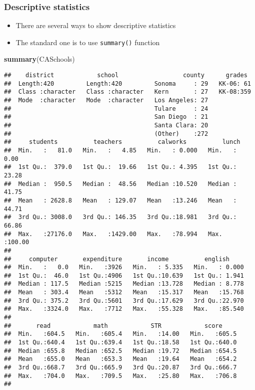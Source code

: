 \documentclass[]{book}
\newenvironment{Shaded}{\begin{snugshade}}{\end{snugshade}}
\newcommand{\KeywordTok}[1]{\textcolor[rgb]{0.13,0.29,0.53}{\textbf{#1}}}
\newcommand{\NormalTok}[1]{#1}
\providecommand{\tightlist}{%
  \setlength{\itemsep}{0pt}\setlength{\parskip}{0pt}}
\begin{document}
\hypertarget{descriptive-statistics}{%
\subsubsection{Descriptive statistics}\label{descriptive-statistics}}

\begin{itemize}
\tightlist
\item
  There are several ways to show descriptive statistics
\item
  The standard one is to use \texttt{summary()} function
\end{itemize}

\begin{Shaded}
\begin{Highlighting}[]
\KeywordTok{summary}\NormalTok{(CASchools)}
\end{Highlighting}
\end{Shaded}

\begin{verbatim}
##    district            school                  county      grades   
##  Length:420         Length:420         Sonoma     : 29   KK-06: 61  
##  Class :character   Class :character   Kern       : 27   KK-08:359  
##  Mode  :character   Mode  :character   Los Angeles: 27              
##                                        Tulare     : 24              
##                                        San Diego  : 21              
##                                        Santa Clara: 20              
##                                        (Other)    :272              
##     students          teachers          calworks          lunch       
##  Min.   :   81.0   Min.   :   4.85   Min.   : 0.000   Min.   :  0.00  
##  1st Qu.:  379.0   1st Qu.:  19.66   1st Qu.: 4.395   1st Qu.: 23.28  
##  Median :  950.5   Median :  48.56   Median :10.520   Median : 41.75  
##  Mean   : 2628.8   Mean   : 129.07   Mean   :13.246   Mean   : 44.71  
##  3rd Qu.: 3008.0   3rd Qu.: 146.35   3rd Qu.:18.981   3rd Qu.: 66.86  
##  Max.   :27176.0   Max.   :1429.00   Max.   :78.994   Max.   :100.00  
##                                                                       
##     computer       expenditure       income          english      
##  Min.   :   0.0   Min.   :3926   Min.   : 5.335   Min.   : 0.000  
##  1st Qu.:  46.0   1st Qu.:4906   1st Qu.:10.639   1st Qu.: 1.941  
##  Median : 117.5   Median :5215   Median :13.728   Median : 8.778  
##  Mean   : 303.4   Mean   :5312   Mean   :15.317   Mean   :15.768  
##  3rd Qu.: 375.2   3rd Qu.:5601   3rd Qu.:17.629   3rd Qu.:22.970  
##  Max.   :3324.0   Max.   :7712   Max.   :55.328   Max.   :85.540  
##                                                                   
##       read            math            STR            score      
##  Min.   :604.5   Min.   :605.4   Min.   :14.00   Min.   :605.5  
##  1st Qu.:640.4   1st Qu.:639.4   1st Qu.:18.58   1st Qu.:640.0  
##  Median :655.8   Median :652.5   Median :19.72   Median :654.5  
##  Mean   :655.0   Mean   :653.3   Mean   :19.64   Mean   :654.2  
##  3rd Qu.:668.7   3rd Qu.:665.9   3rd Qu.:20.87   3rd Qu.:666.7  
##  Max.   :704.0   Max.   :709.5   Max.   :25.80   Max.   :706.8  
## 
\end{verbatim}
\end{document}
